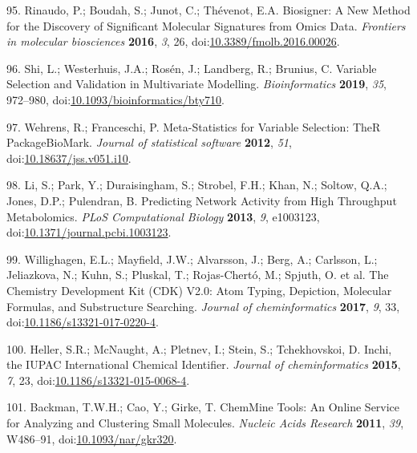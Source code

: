\documentclass[]{article}
\begin{document}
\leavevmode\hypertarget{ref-rinaudo_2016}{}%
95. Rinaudo, P.; Boudah, S.; Junot, C.; Thévenot, E.A. Biosigner: A New Method for the Discovery of Significant Molecular Signatures from Omics Data. \emph{Frontiers in molecular biosciences} \textbf{2016}, \emph{3}, 26, doi:\href{https://doi.org/10.3389/fmolb.2016.00026}{10.3389/fmolb.2016.00026}.

\leavevmode\hypertarget{ref-shi_2019}{}%
96. Shi, L.; Westerhuis, J.A.; Rosén, J.; Landberg, R.; Brunius, C. Variable Selection and Validation in Multivariate Modelling. \emph{Bioinformatics} \textbf{2019}, \emph{35}, 972--980, doi:\href{https://doi.org/10.1093/bioinformatics/bty710}{10.1093/bioinformatics/bty710}.

\leavevmode\hypertarget{ref-wehrens_2012}{}%
97. Wehrens, R.; Franceschi, P. Meta-Statistics for Variable Selection: TheR PackageBioMark. \emph{Journal of statistical software} \textbf{2012}, \emph{51}, doi:\href{https://doi.org/10.18637/jss.v051.i10}{10.18637/jss.v051.i10}.

\leavevmode\hypertarget{ref-li_2013}{}%
98. Li, S.; Park, Y.; Duraisingham, S.; Strobel, F.H.; Khan, N.; Soltow, Q.A.; Jones, D.P.; Pulendran, B. Predicting Network Activity from High Throughput Metabolomics. \emph{PLoS Computational Biology} \textbf{2013}, \emph{9}, e1003123, doi:\href{https://doi.org/10.1371/journal.pcbi.1003123}{10.1371/journal.pcbi.1003123}.

\leavevmode\hypertarget{ref-willighagen_2017}{}%
99. Willighagen, E.L.; Mayfield, J.W.; Alvarsson, J.; Berg, A.; Carlsson, L.; Jeliazkova, N.; Kuhn, S.; Pluskal, T.; Rojas-Chertó, M.; Spjuth, O. et al. The Chemistry Development Kit (CDK) V2.0: Atom Typing, Depiction, Molecular Formulas, and Substructure Searching. \emph{Journal of cheminformatics} \textbf{2017}, \emph{9}, 33, doi:\href{https://doi.org/10.1186/s13321-017-0220-4}{10.1186/s13321-017-0220-4}.

\leavevmode\hypertarget{ref-heller_2015}{}%
100. Heller, S.R.; McNaught, A.; Pletnev, I.; Stein, S.; Tchekhovskoi, D. Inchi, the IUPAC International Chemical Identifier. \emph{Journal of cheminformatics} \textbf{2015}, \emph{7}, 23, doi:\href{https://doi.org/10.1186/s13321-015-0068-4}{10.1186/s13321-015-0068-4}.

\leavevmode\hypertarget{ref-backman_2011}{}%
101. Backman, T.W.H.; Cao, Y.; Girke, T. ChemMine Tools: An Online Service for Analyzing and Clustering Small Molecules. \emph{Nucleic Acids Research} \textbf{2011}, \emph{39}, W486--91, doi:\href{https://doi.org/10.1093/nar/gkr320}{10.1093/nar/gkr320}.
\end{document}
